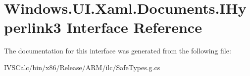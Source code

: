 \hypertarget{interface_windows_1_1_u_i_1_1_xaml_1_1_documents_1_1_i_hyperlink3}{}\section{Windows.\+U\+I.\+Xaml.\+Documents.\+I\+Hyperlink3 Interface Reference}
\label{interface_windows_1_1_u_i_1_1_xaml_1_1_documents_1_1_i_hyperlink3}


The documentation for this interface was generated from the following file\+:\begin{DoxyCompactItemize}
\item 
I\+V\+S\+Calc/bin/x86/\+Release/\+A\+R\+M/ilc/Safe\+Types.\+g.\+cs\end{DoxyCompactItemize}
